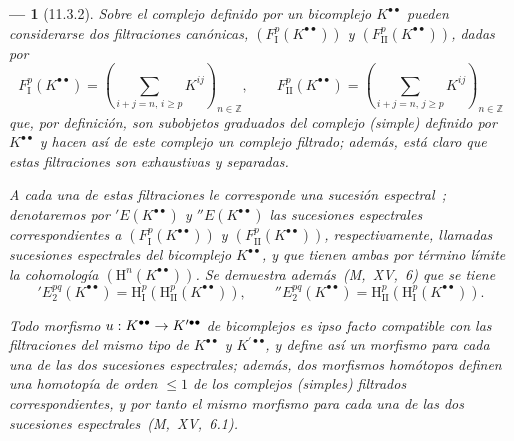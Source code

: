 \documentclass[10pt,oneside,openany]{book}
\theoremstyle{egaenv}\newtheorem*{env}{---}
\theoremstyle{egastatement}
\theoremstyle{egadescription}
\newcommand{\oldpage}[2][]{\marginnote{\normalfont\scriptsize\textbf{#1}\,|\,#2}\ignorespaces}
\renewcommand{\leq}{\leqslant}
\renewcommand{\geq}{\geqslant}
\renewcommand{\to}{\mathchoice{\longrightarrow}{\rightarrow}{\rightarrow}{\rightarrow}}
\begin{document}
\begin{env}[11.3.2]
\label{0.11.3.2}
\label{0.11.3.2-fr}
Sobre el complejo definido por un bicomplejo $K^{\bullet\bullet}$ pueden considerarse dos filtraciones canónicas, $(F_{\mathrm I}^p(K^{\bullet\bullet}))$ y $(F_{\mathrm{II}}^p(K^{\bullet\bullet}))$, dadas por
\[
\label{0.11.3.2.1-fr}
  F_{\mathrm I}^p(K^{\bullet\bullet})
  =\left(\sum_{i+j=n,\,i\geq p}K^{ij}\right)_{n\in\mathbb Z},
  \qquad
  F_{\mathrm{II}}^p(K^{\bullet\bullet})
  =\left(\sum_{i+j=n,\,j\geq p}K^{ij}\right)_{n\in\mathbb Z}
  \tag{11.3.2.1}
\]
\oldpage[0\textsubscript{III}]{30}
que, por definición, son subobjetos graduados del complejo (simple) definido por $K^{\bullet\bullet}$ y hacen así de este complejo un complejo filtrado;
además, está claro que estas filtraciones son \emph{exhaustivas} y \emph{separadas}.

A cada una de estas filtraciones le corresponde una sucesión espectral~;
denotaremos por $'E(K^{\bullet\bullet})$ y $''E(K^{\bullet\bullet})$ las sucesiones espectrales correspondientes a $(F_{\mathrm I}^p(K^{\bullet\bullet}))$ y $(F_{\mathrm{II}}^p(K^{\bullet\bullet}))$, respectivamente, llamadas \emph{sucesiones espectrales del bicomplejo $K^{\bullet\bullet}$}, y que tienen ambas por término límite la cohomología $(\mathrm H^n(K^{\bullet\bullet}))$.
Se demuestra además~(M,~XV,~6) que se tiene
\[
\label{0.11.3.2.2-fr}
  'E_2^{pq}(K^{\bullet\bullet})
  =\mathrm H_{\mathrm I}^p(\mathrm H_{\mathrm{II}}^p(K^{\bullet\bullet})),
  \qquad
  ''E_2^{pq}(K^{\bullet\bullet})
  =\mathrm H_{\mathrm{II}}^p(\mathrm H_{\mathrm I}^p(K^{\bullet\bullet})).
  \tag{11.3.2.2}
\]

Todo morfismo $u:K^{\bullet\bullet}\to K^{\prime\bullet\bullet}$ de bicomplejos es \emph{ipso facto} compatible con las filtraciones del mismo tipo de $K^{\bullet\bullet}$ y $K^{\prime\bullet\bullet}$, y define así un morfismo para cada una de las dos sucesiones espectrales;
además, dos morfismos \emph{homótopos} definen una homotopía \emph{de orden $\leq1$} de los complejos (simples) filtrados correspondientes, y por tanto el \emph{mismo} morfismo para cada una de las dos sucesiones espectrales~(M,~XV,~6.1).
\end{env}
\end{document}
